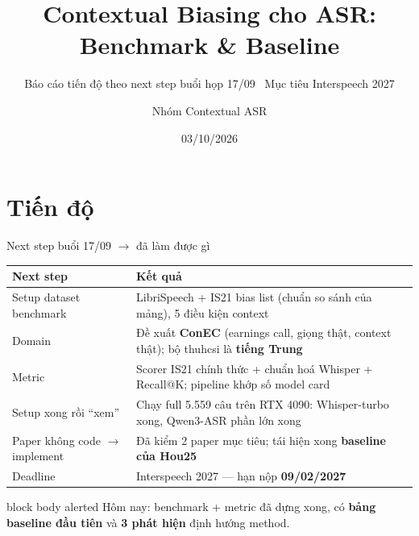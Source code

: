 \documentclass[aspectratio=169,xcolor=table]{beamer}
\title{Contextual Biasing cho ASR:\\Benchmark \& Baseline}
\subtitle{Báo cáo tiến độ theo next step buổi họp 17/09 \textbullet\ Mục tiêu Interspeech 2027}
\author{Nhóm Contextual ASR}
\institute{}
\date{03/10/2026}
\newcommand{\hi}[1]{\textcolor{Primary}{\textbf{#1}}}
\newcommand{\bad}[1]{\textcolor{RiskRed}{\textbf{#1}}}
\newcommand{\cmark}{\textcolor{GoodGreen}{\ding{51}}}
\newcommand{\pmark}{\textcolor{Accent!85!black}{\ding{108}}}
\begin{document}
\begin{frame}[plain]\titlepage\end{frame}

\section{Tiến độ}
\begin{frame}{Next step buổi 17/09 $\rightarrow$ đã làm được gì}
\small\renewcommand{\arraystretch}{1.08}
\begin{tabular}{@{}p{4.2cm}p{8.1cm}c@{}}
\toprule
\textbf{Next step} & \textbf{Kết quả} & \\
\midrule
Setup dataset benchmark & LibriSpeech + IS21 bias list (chuẩn so sánh của mảng), 5 điều kiện context & \cmark\\
Domain & Đề xuất \hi{ConEC} (earnings call, giọng thật, context thật); bộ thuhcsi là \bad{tiếng Trung} & \pmark\\
Metric & Scorer IS21 chính thức + chuẩn hoá Whisper + Recall@K; pipeline khớp số model card & \cmark\\
Setup xong rồi ``xem'' & Chạy full 5.559 câu trên RTX 4090: Whisper-turbo xong, Qwen3-ASR phần lớn xong & \pmark\\
Paper không code $\rightarrow$ implement & Đã kiểm 2 paper mục tiêu; tái hiện xong \hi{baseline của Hou25} & \pmark\\
Deadline & Interspeech 2027 --- hạn nộp \hi{09/02/2027} & \cmark\\
\bottomrule
\end{tabular}
\vfill
\begin{beamercolorbox}[sep=0.40em,center,rounded=true]{block body alerted}
\footnotesize Hôm nay: benchmark + metric đã dựng xong, có \textbf{bảng baseline đầu tiên} và \textbf{3 phát hiện} định hướng method.
\end{beamercolorbox}
\end{frame}

\end{document}
